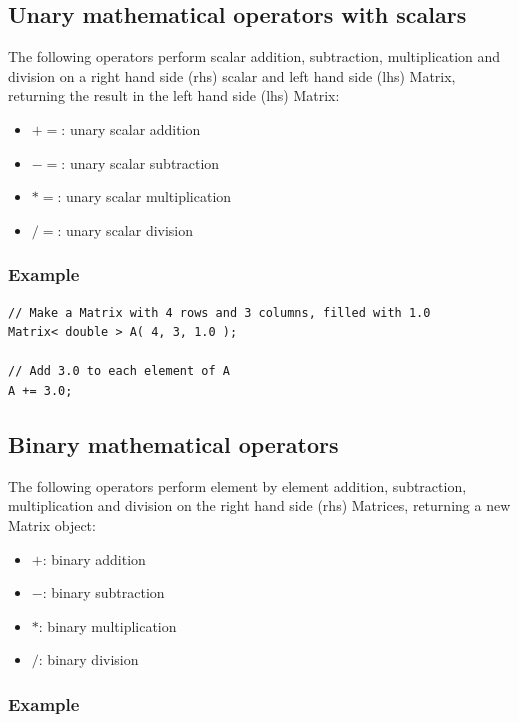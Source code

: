 \documentclass{report}
\begin{document}
\subsection{Unary mathematical operators with scalars}

The following operators perform scalar addition, subtraction,
multiplication and division on a right hand side (rhs) scalar and left
hand side (lhs) Matrix, returning the result in the left hand side
(lhs) Matrix:

\begin{itemize}
\item $+=$: unary scalar addition
\item $-=$: unary scalar subtraction
\item $*=$: unary scalar multiplication
\item $/=$: unary scalar division
\end{itemize}

\subsubsection{Example}

\begin{verbatim}
// Make a Matrix with 4 rows and 3 columns, filled with 1.0
Matrix< double > A( 4, 3, 1.0 );

// Add 3.0 to each element of A
A += 3.0;

\end{verbatim}

\subsection{Binary mathematical operators}

The following operators perform element by element addition,
subtraction, multiplication and division on the right hand side (rhs)
Matrices, returning a new Matrix object:

\begin{itemize}
\item $+$: binary addition
\item $-$: binary subtraction
\item $*$: binary multiplication
\item $/$: binary division
\end{itemize}

\subsubsection{Example}
\end{document}
